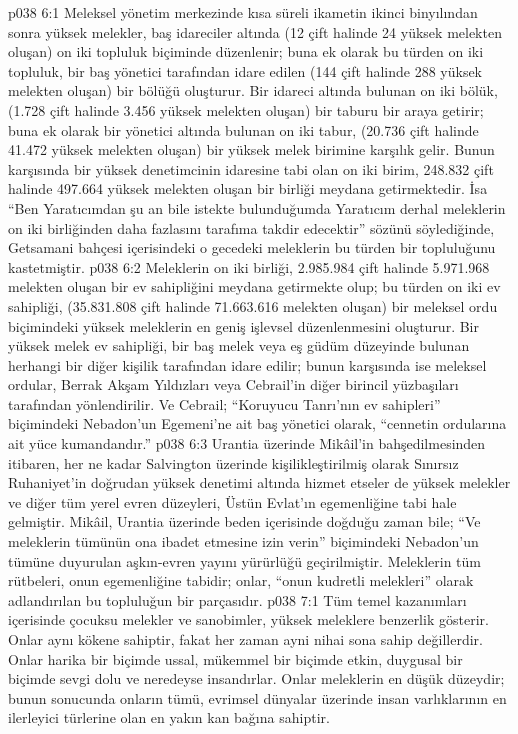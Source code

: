 \vs p038 6:1 Meleksel yönetim merkezinde kısa süreli ikametin ikinci binyılından sonra yüksek melekler, baş idareciler altında (12 çift halinde 24 yüksek melekten oluşan) on iki topluluk biçiminde düzenlenir; buna ek olarak bu türden on iki topluluk, bir baş yönetici tarafından idare edilen (144 çift halinde 288 yüksek melekten oluşan) bir bölüğü oluşturur. Bir idareci altında bulunan on iki bölük, (1.728 çift halinde 3.456 yüksek melekten oluşan) bir taburu bir araya getirir; buna ek olarak bir yönetici altında bulunan on iki tabur, (20.736 çift halinde 41.472 yüksek melekten oluşan) bir yüksek melek birimine karşılık gelir. Bunun karşısında bir yüksek denetimcinin idaresine tabi olan on iki birim, 248.832 çift halinde 497.664 yüksek melekten oluşan bir birliği meydana getirmektedir. İsa “Ben Yaratıcımdan şu an bile istekte bulunduğumda Yaratıcım derhal meleklerin on iki birliğinden daha fazlasını tarafıma takdir edecektir” sözünü söylediğinde, Getsamani bahçesi içerisindeki o gecedeki meleklerin bu türden bir topluluğunu kastetmiştir.
\vs p038 6:2 Meleklerin on iki birliği, 2.985.984 çift halinde 5.971.968 melekten oluşan bir ev sahipliğini meydana getirmekte olup; bu türden on iki ev sahipliği, (35.831.808 çift halinde 71.663.616 melekten oluşan) bir meleksel ordu biçimindeki yüksek meleklerin en geniş işlevsel düzenlenmesini oluşturur. Bir yüksek melek ev sahipliği, bir baş melek veya eş güdüm düzeyinde bulunan herhangi bir diğer kişilik tarafından idare edilir; bunun karşısında ise meleksel ordular, Berrak Akşam Yıldızları veya Cebrail’in diğer birincil yüzbaşıları tarafından yönlendirilir. Ve Cebrail; “Koruyucu Tanrı’nın ev sahipleri” biçimindeki Nebadon’un Egemeni’ne ait baş yönetici olarak, “cennetin ordularına ait yüce kumandandır.”
\vs p038 6:3 Urantia üzerinde Mikâil’in bahşedilmesinden itibaren, her ne kadar Salvington üzerinde kişilikleştirilmiş olarak Sınırsız Ruhaniyet’in doğrudan yüksek denetimi altında hizmet etseler de yüksek melekler ve diğer tüm yerel evren düzeyleri, Üstün Evlat’ın egemenliğine tabi hale gelmiştir. Mikâil, Urantia üzerinde beden içerisinde doğduğu zaman bile; “Ve meleklerin tümünün ona ibadet etmesine izin verin” biçimindeki Nebadon’un tümüne duyurulan aşkın\hyp{}evren yayını yürürlüğü geçirilmiştir. Meleklerin tüm rütbeleri, onun egemenliğine tabidir; onlar, “onun kudretli melekleri” olarak adlandırılan bu topluluğun bir parçasıdır.
\vs p038 7:1 Tüm temel kazanımları içerisinde çocuksu melekler ve sanobimler, yüksek meleklere benzerlik gösterir. Onlar aynı kökene sahiptir, fakat her zaman ayni nihai sona sahip değillerdir. Onlar harika bir biçimde ussal, mükemmel bir biçimde etkin, duygusal bir biçimde sevgi dolu ve neredeyse insandırlar. Onlar meleklerin en düşük düzeydir; bunun sonucunda onların tümü, evrimsel dünyalar üzerinde insan varlıklarının en ilerleyici türlerine olan en yakın kan bağına sahiptir.
